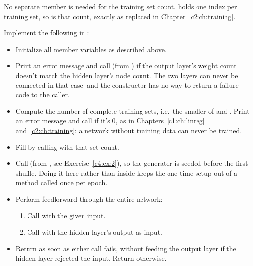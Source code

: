 No separate member is needed for the training set count.  holds one index per
training set, so  is that count, exactly as  replaced
 in Chapter~\ref{c2:ch:training}.

\label{c4:ex:7}
Implement the following in :

\begin{itemize}
  \item Initialize all member variables as described above.
  \item Print an error message and call  (from ) if the
    output layer's weight count doesn't match the hidden layer's node count. The two layers can
    never be connected in that case, and the constructor has no way to return a failure code to the
    caller.
  \item Compute the number of complete training sets, i.e.\ the smaller of
     and . Print an error message and call
     if it's 0, as in Chapters~\ref{c1:ch:linreg}
    and~\ref{c2:ch:training}: a network without training data can never be trained.
  \item Fill  by calling  with that set count.
  \item Call  (from , see Exercise~\ref{c4:ex:2}), so the
    generator is seeded before the first shuffle. Doing it here rather than inside
     keeps the one-time setup out of a method called once per epoch.
\end{itemize}

\begin{itemize}
  \item Perform feedforward through the entire network:
  \begin{enumerate}
    \item Call  with the given input.
    \item Call  with the hidden layer's
      output as input.
  \end{enumerate}
  \item Return  as soon as either call fails, without feeding the output layer if the
    hidden layer rejected the input. Return  otherwise.
\end{itemize}

